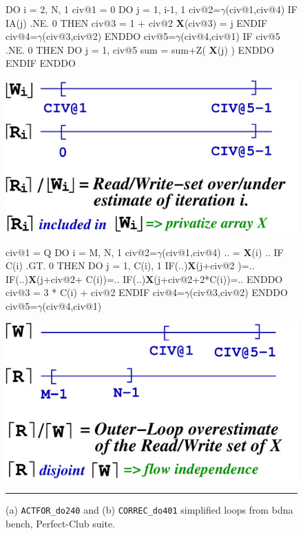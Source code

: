 \documentclass{sig-alternate}
\newcommand{\mymath}[1]{$ #1 $}
\begin{document}
\begin{figure}
\begin{minipage}{0.45\columnwidth}
\begin{colorcode}
DO i = 2, N, 1
 civ@1 = 0
 DO j = 1, i-1, 1
  civ@2=\mymath{\gamma}(civ@1,civ@4)
  IF IA(j) .NE. 0 THEN
   civ@3 = 1 + civ@2
   {\bf{}X}(civ@3) = j
  ENDIF
  civ@4=\mymath{\gamma}(civ@3,civ@2)
 ENDDO
 civ@5=\mymath{\gamma}(civ@4,civ@1)
 IF civ@5 .NE. 0 THEN
  DO j = 1, civ@5
   sum = sum+Z( {\bf{}X}(j) )
ENDDO ENDIF ENDDO
\end{colorcode}
\includegraphics[width=1.1\textwidth]{Figures/ActforRWsets} 
\end{minipage}
\begin{minipage}{0.48\columnwidth}
\begin{colorcode}
civ@1 = Q
DO i = M, N, 1
 civ@2=\mymath{\gamma}(civ@1,civ@4)
 .. = {\bf X}(i) ..
 IF C(i) .GT. 0 THEN
  DO j = 1, C(i), 1
   IF(..){\bf{}X}(j+civ@2       )=..
   IF(..){\bf{}X}(j+civ@2+  C(i))=..
   IF(..){\bf{}X}(j+civ@2+2*C(i))=..
  ENDDO
  civ@3 = 3 * C(i) + civ@2
 ENDIF
 civ@4=\mymath{\gamma}(civ@3,civ@2)
ENDDO
civ@5=\mymath{\gamma}(civ@4,civ@1)  
\end{colorcode}
\hspace{2ex}\includegraphics[width=1\textwidth]{Figures/CorrecRWsets} 
\end{minipage}
\hrule
\caption{(a) {\tt ACTFOR\_do240} and (b) {\tt CORREC\_do401} simplified loops 
            from {\sc bdna} bench, {\sc Perfect-Club} suite.}
\label{fig:codeActforCorrec}
\end{figure}
\end{document}
